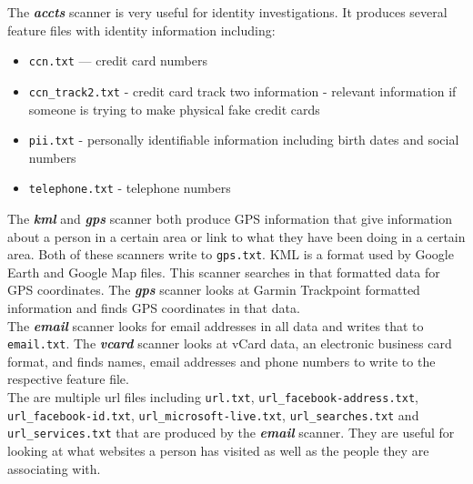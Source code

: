 \documentclass[11pt]{article} %
\begin{document}
The  \textbf{\textit{accts}} scanner is very useful for identity investigations. It produces several feature files with identity information including:
\begin{itemize}
\item \texttt{ccn.txt} --- credit card numbers
\item \texttt{ccn\_track2.txt} - credit card track two information -  relevant information if someone is trying to make physical fake credit cards
\item \texttt{pii.txt} - personally identifiable information including birth dates and social numbers
\item \texttt{telephone.txt} - telephone numbers
\end{itemize}

The  \textbf{\textit{kml}} and  \textbf{\textit{gps}} scanner both produce GPS information that give information about a person in a certain area or link to what they have been doing in a certain area. Both of these scanners write to \texttt{gps.txt}. KML is a format used by Google Earth and Google Map files. This scanner searches in that formatted data for GPS coordinates. The  \textbf{\textit{gps}} scanner looks at Garmin Trackpoint formatted information and finds GPS coordinates  in that data.\\

The  \textbf{\textit{email}} scanner looks for email addresses in all data and writes that to \texttt{email.txt}. The  \textbf{\textit{vcard}} scanner looks at vCard data, an electronic business card format, and finds names, email addresses and phone numbers to write to the respective feature file.\\

The are multiple url files including \texttt{url.txt}, \texttt{url\_facebook-address.txt}, \texttt{url\_facebook-id.txt}, \texttt{url\_microsoft-live.txt}, \texttt{url\_searches.txt} and \texttt{url\_services.txt} that are produced by the \textbf{\textit{email}} scanner. They are useful for looking at what websites a person has visited as well as the people they are associating with.\\
\end{document}
